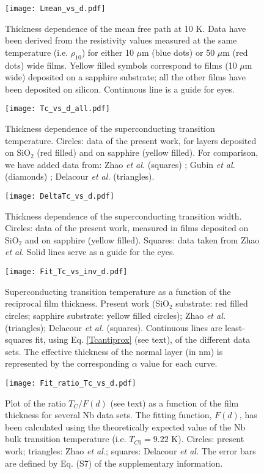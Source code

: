 \documentclass[reprint,onecolumn,superscriptaddress,a4paper,nofootinbib,floatfix]{revtex4-1}
\begin{document}
\begin{figure}[h]
\centering
\texttt{[image: Lmean\_vs\_d.pdf]}
\caption{Thickness dependence of the mean free path at 10 K. Data have been derived from the resistivity values measured at the same temperature (i.e. $\rho_{10}$) for either 10 $\mu$m (blue dots) or 50 $\mu$m (red dots) wide films. Yellow filled symbols correspond to films (10 $\mu$m wide) deposited on a sapphire substrate; all the other films have been deposited on silicon. Continuous line is a guide for eyes.} 
\label{Lmean}
\end{figure}

\begin{figure}[ht]
\centering
\texttt{[image: Tc\_vs\_d\_all.pdf]}
\caption{Thickness dependence of the superconducting transition temperature. Circles: data of the present work, for layers deposited on SiO$_2$ (red filled) and on sapphire (yellow filled). For comparison, we have added data from: Zhao \textit{et al.} (squares) \cite{Zhao}; Gubin \textit{et al.} (diamonds) \cite{Gubin2005}; Delacour \textit{et al.} (triangles).\cite{Delacour} }  
\label{FigTc}
\end{figure}

\begin{figure}[ht]
\centering
\texttt{[image: DeltaTc\_vs\_d.pdf]}
\caption{Thickness dependence of the superconducting transition width. Circles: data of the present work, measured in films deposited on SiO$_2$ and on sapphire (yellow filled). Squares: data taken from Zhao \textit{et al.} \cite{Zhao} Solid lines serve as a guide for the eyes.}  
\label{DeltaTc_vs_d}
\end{figure}

\begin{figure}[ht]
\centering
\texttt{[image: Fit\_Tc\_vs\_inv\_d.pdf]}
\caption{Superconducting transition temperature as a function of the reciprocal film thickness. Present work (SiO$_2$ substrate: red filled circles; sapphire substrate: yellow filled circles); Zhao \textit{et al.}\cite{Zhao} (triangles); Delacour \textit{et al.}\cite{Delacour} (squares). Continuous lines are least-squares fit, using Eq. \eqref{Tcantiprox} (see text), of the different data sets. The effective thickness of the normal layer (in nm) is represented by the corresponding $\alpha$ value for each curve.}  
\label{fit_Tc_vs_d-1}
\end{figure}

\begin{figure}[ht]
\centering
\texttt{[image: Fit\_ratio\_Tc\_vs\_d.pdf]}
\caption{Plot of the ratio $T_C/F(d)$ (see text) as a function of the film thickness for several Nb data sets. The fitting function, $F(d)$, has been calculated using the theoretically expected value of the Nb bulk transition temperature (i.e. $T_{C0} = 9.22$ K). Circles: present work; triangles: Zhao \textit{et al.}\cite{Zhao}; squares: Delacour \textit{et al.}\cite{Delacour} The error bars are defined by Eq. (S7) of the supplementary information.}  
\label{Fit_ratio_Tc_vs_d}
\end{figure}
\end{document}
